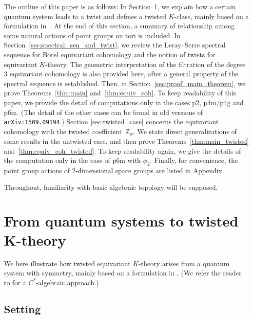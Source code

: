 \documentclass[pdftex]{sigma}
\theoremstyle{definition}
\newcommand{\Z}{\mathbb{Z}}
\begin{document}
The outline of this paper is as follows: In Section~\ref{sec:quantum_system_to_K}, we explain how a certain quantum system leads to a twist and def\/ines a twisted $K$-class, mainly based on a formulation in~\cite{F-M}. At the end of this section, a summary of relationship among some natural actions of point groups on tori is included. In Section~\ref{sec:spectral_seq_and_twist}, we review the Leray--Serre spectral sequence for Borel equivariant cohomology and the notion of twists for equivariant $K$-theory. The geometric interpretation of the f\/iltration of the degree $3$ equivariant cohomology is also provided here, after a general property of the spectral sequence is established. Then, in Section~\ref{sec:proof_main_theorem}, we prove Theorems~\ref{thm:main} and~\ref{thm:equiv_coh}. To keep readability of this paper, we provide the detail of computations only in the cases \textsf{p2}, \textsf{p4m/p4g} and \textsf{p6m}. (The detail of the other cases can be found in old versions of \verb|arXiv:1509.09194|.) Section \ref{sec:twisted_case} concerns the equivariant cohomology with the twisted coef\/f\/i\-cient~$\Z_\phi$. We state direct generalizations of some results in the untwisted case, and then prove Theorems~\ref{thm:main_twisted} and~\ref{thm:equiv_coh_twisted}. To keep readability again, we give the details of the computation only in the case of \textsf{p6m} with $\phi_2$. Finally, for convenience, the point group actions of $2$-dimensional space groups are listed in Appendix.

Throughout, familiarity with basic algebraic topology \cite{B-T,Ha} will be supposed.

\section[From quantum systems to twisted $K$-theory]{From quantum systems to twisted $\boldsymbol{K}$-theory}\label{sec:quantum_system_to_K}

We here illustrate how twisted equivariant $K$-theory arises from a quantum system with symmetry, mainly based on a formulation in \cite{F-M}. (We refer the reader to \cite{Th} for a $C^*$-algebraic approach.)

\subsection{Setting}
\end{document}
